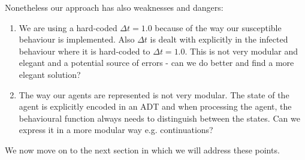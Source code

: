 Nonetheless our approach has also weaknesses and dangers:
\begin{enumerate}
	\item We are using a hard-coded $\Delta t = 1.0$ because of the way our susceptible behaviour is implemented. Also $\Delta t$ is dealt with explicitly in the infected behaviour where it is hard-coded to $\Delta t = 1.0$. This is not very modular and elegant and a potential source of errors - can we do better and find a more elegant solution? 
	\item The way our agents are represented is not very modular. The state of the agent is explicitly encoded in an ADT and when processing the agent, the behavioural function always needs to distinguish between the states. Can we express it in a more modular way e.g. continuations?
\end{enumerate}

We now move on to the next section in which we will address these points.